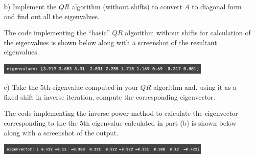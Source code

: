 b) Implement the $QR$ algorithm (without shifts) to convert $A$ to diagonal form and find out all the eigenvalues.

The code implementing the ``basic'' $QR$ algorithm without shifts for calculation of the eigenvalues is shown below along with a screenshot of the resultant eigenvalues.

\begin{center}
    \includegraphics[width=0.8\textwidth]{prob5b.png}
\end{center}

c) Take the 5th eigenvalue computed in your $QR$ algorithm and, using it as a fixed shift in inverse iteration, compute the corresponding eigenvector.

The code implementing the inverse power method to calculate the eigenvector corresponding to the the 5th eigenvalue calculated in part (b) is shown below along with a screenshot of the output.

\begin{center}
    \includegraphics[width=0.8\textwidth]{prob5c.png}
\end{center}



